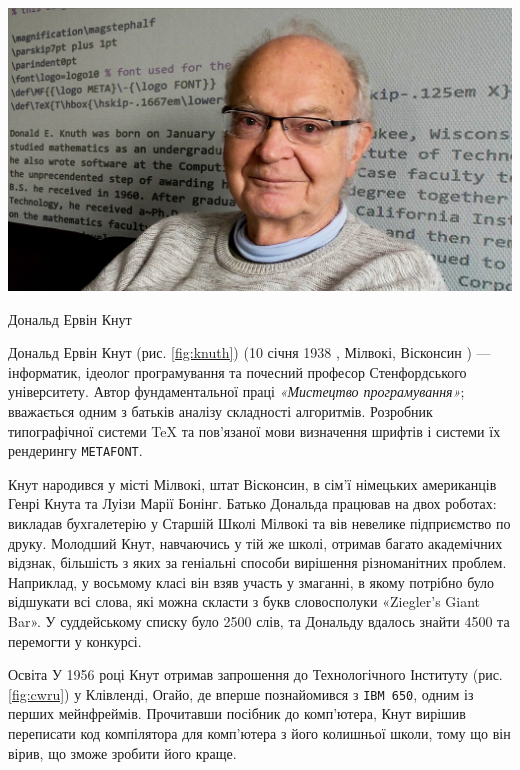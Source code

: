 \documentclass{article}
\begin{document}
\begin{wrapstuff}[type=figure, l, top=4, width=0.47\textwidth]
    \centering
    \includegraphics[width=\linewidth]{Knuth.jpeg}
    \caption{Дональд Ервін Кнут}
    \label{fig:knuth}
\end{wrapstuff}
Дональд Ервін Кнут (рис. \ref{fig:knuth}) (10 січня 1938 , Мілвокі, Вісконсин ) --- інформатик, ідеолог програмування та почесний професор Стенфордського університету. Автор фундаментальної праці \textit{«Мистецтво програмування»}; вважається одним з батьків аналізу складності алгоритмів. Розробник типографічної системи \TeX{} та пов'язаної мови визначення шрифтів і системи їх рендерингу \texttt{METAFONT}.

Кнут народився у місті Мілвокі, штат Вісконсин, в сім'ї німецьких американців Генрі Кнута та Луізи Марії Бонінг. Батько Дональда працював на двох роботах: викладав бухгалетерію у Старшій Школі Мілвокі та вів невелике підприємство по друку. Молодший Кнут, навчаючись у тій же школі, отримав багато академічних відзнак, більшість з яких за геніальні способи вирішення різноманітних проблем. Наприклад, у восьмому класі він взяв участь у змаганні, в якому потрібно було відшукати всі слова, які можна скласти з букв словосполуки «Ziegler's Giant Bar». У суддейському списку було 2500 слів, та Дональду вдалось знайти 4500 та перемогти у конкурсі.

Освіта У 1956 році Кнут отримав запрошення до Технологічного Інституту (рис. \ref{fig:cwru}) у Клівленді, Огайо, де вперше познайомився з \texttt{IBM 650}, одним із перших мейнфреймів. Прочитавши посібник до комп'ютера, Кнут вирішив переписати код компілятора для комп'ютера з його колишньої школи, тому що
він вірив, що зможе зробити його краще.
\end{document}
